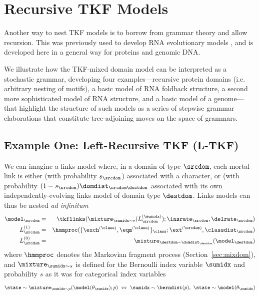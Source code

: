

\section{Recursive TKF Models}

Another way to nest TKF models is to borrow from grammar theory and allow recursion.
This was previously used to develop RNA evolutionary models \cite{Holmes2004}, and is developed here in a general way for proteins
and genomic DNA.

We illustrate how the TKF-mixed domain model can be interpreted as a stochastic grammar,
 developing four examples---recursive protein domains (i.e. arbitrary nesting of motifs), a basic model of RNA foldback structure, a second more sophisticated model of RNA structure, and a basic model of a genome---that
 highlight the structure of such models as a series of stepwise grammar elaborations that constitute tree-adjoining moves on the space of grammars.

\subsection{Example One: Left-Recursive TKF (L-TKF)}

\newcommand\tok{s}
\newcommand\ntlinks{{\tt L}}
\newcommand\ntimm{{\tt K}}
\newcommand\ntmor{{\tt M}}
\newcommand\ntnew{{\tt N}}
\newcommand\ntsur{{\tt S}}
\newcommand\ntexp{{\tt E}}
\newcommand\ntaln{{\tt A}}
\newcommand\ntins{{\tt I}}
\newcommand\ntdel{{\tt D}}
\newcommand\ntparent{{\tt P}}
\newcommand\ntchild{{\tt C}}

\newcommand\ntfrag{{\tt F}}
\newcommand\ntgen{{\tt G}}
\newcommand\ntrem{{\tt R}}

\newcommand\ntbegin{{\tt B}}

\newcommand\nullability{\eta}

\newcommand\term{{\tt T}}


We can imagine a links model where, in a domain of type $\srcdom$,
each mortal link is either (with probability $\tok_\srcdom$) associated with a character,
or (with probability $(1 - \tok_\srcdom) \domdist_{\srcdom\destdom}$ associated with its own
independently-evolving links model of domain type $\destdom$.
Links models can thus be nested {\em ad infinitum}
\begin{eqnarray*}
\model_\srcdom & = &
\tkflinks(\mixture_{\sumidx\sim\tok}(L^{(\sumidx)}_\srcdom);\insrate_\srcdom,\delrate_\srcdom)
\\
L^{(1)}_\srcdom & = & \hmmproc(\{\exch^{(\class)},\eqm^{(\class)}\}_\class;\ext^{(\srcdom)},\classdist_\srcdom) \\
L^{(0)}_\srcdom & = & \mixture_{\destdom\sim\domdist_\destdom}(\model_\destdom)
\end{eqnarray*}
where $\hmmproc$ denotes the Markovian fragment process (Section~\ref{sec:mixdom}),
and $\mixture_{\sumidx\sim\tok}$ is defined for the Bernoulli index variable $\sumidx$ and probability $\tok$ as it was for categorical index variables
\[
\state \sim \mixture_{\sumidx\sim p}(\model(\theta_\sumidx);p)\ \Leftrightarrow\ 
\sumidx \sim \berndist(p),\ \state \sim \model(\theta_\sumidx)
\]

